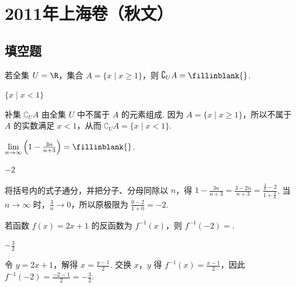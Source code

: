 \chapter{2011年上海卷（秋文）}

\section{填空题}

\begin{problem}
若全集 \(U = \R\)，集合 \(A = \{x \mid x \geqslant 1\}\)，则 \(\complement_U A =\fillinblank{}\).
\end{problem}

\begin{answer}
\(\{x\mid x<1\}\)
\end{answer}

\begin{solution}
补集 \(\complement_U A\) 由全集 \(U\) 中不属于 \(A\) 的元素组成. 因为 \(A=\{x\mid x\geqslant1\}\)，所以不属于 \(A\) 的实数满足 \(x<1\)，从而 \(\complement_U A=\{x\mid x<1\}\).
\end{solution}

\begin{problem}
\(\lim\limits_{n\to \infty}\left(1 - \frac{3n}{n + 3}\right) =\fillinblank{}\).
\end{problem}

\begin{answer}
\(-2\)
\end{answer}

\begin{solution}
将括号内的式子通分，并把分子、分母同除以 \(n\)，得
\(1-\frac{3n}{n+3}=\frac{3-2n}{n+3}=\frac{\frac{3}{n}-2}{1+\frac{3}{n}}\). 当 \(n\to\infty\) 时，\(\frac{3}{n}\to0\)，所以原极限为 \(\frac{0-2}{1+0}=-2\).
\end{solution}

\begin{problem}
若函数 \( f(x) = 2x + 1 \) 的反函数为 \( f^{-1}(x) \)，则 \( f^{-1}(-2) = \)\fillinblank{}.
\end{problem}

\begin{answer}
\(-\frac{3}{2}\)
\end{answer}

\begin{solution}
令 \(y=2x+1\)，解得 \(x=\frac{y-1}{2}\). 交换 \(x\)，\(y\) 得 \(f^{-1}(x)=\frac{x-1}{2}\)，因此 \(f^{-1}(-2)=\frac{-2-1}{2}=-\frac{3}{2}\).
\end{solution}

